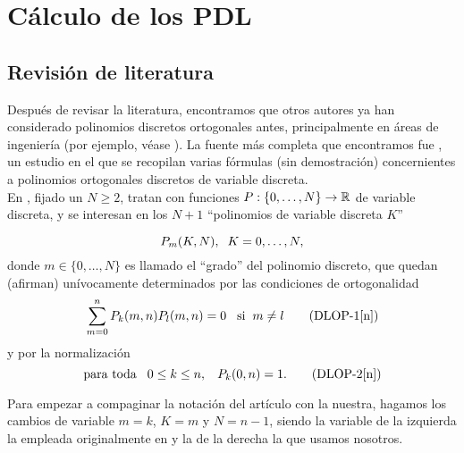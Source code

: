 \chapter{Cálculo de los PDL}

\section{Revisión de literatura}
Después de revisar la literatura, encontramos que
otros autores ya han considerado polinomios discretos ortogonales
antes, principalmente en áreas de ingeniería (por ejemplo, 
véase \cite{papel}). La fuente más completa que encontramos 
fue \cite{Neuman}, un estudio en el que se recopilan 
varias fórmulas (sin demostración) concernientes a polinomios
ortogonales discretos de variable discreta. \\

En \cite{Neuman}, 
fijado un $N \geq 2$,
tratan con funciones $P : \{0, \ldots , N \} \rightarrow \mathbb{R}$
de variable discreta, y 
se interesan en los $N+1$ ``polinomios de variable
discreta $K$''

\[
P_{m}(K, N), \hspace{0.2cm} K=0, \ldots , N,
\]
donde $m \in \{0, \ldots, N \}$ es llamado el ``grado''
del polinomio discreto, que quedan (afirman)
unívocamente determinados por las condiciones
de ortogonalidad
\begin{equation}
\sum\limits_{m=0}^{n}P_{k}(m,n) P_{l}(m,n) =0
\hspace{0.3cm} \text{si} \hspace{0.2cm} m \neq l \tag{DLOP-1[n]} \label{eq:dlop1}
\end{equation}
y por la normalización
\begin{equation}
\text{para toda} \hspace{0.3cm} 0 \leq k \leq n, \hspace{0.3cm} P_{k}(0, n)=1.   \tag{DLOP-2[n]} \label{eq:dlop2}
\end{equation}

Para empezar a compaginar la notación
del artículo con la nuestra, 
hagamos
los cambios de variable $m=k$, $K=m$
y $N=n-1$, siendo la variable de la izquierda la empleada
originalmente en
\cite{Neuman} y la de la derecha la que usamos nosotros. \\

